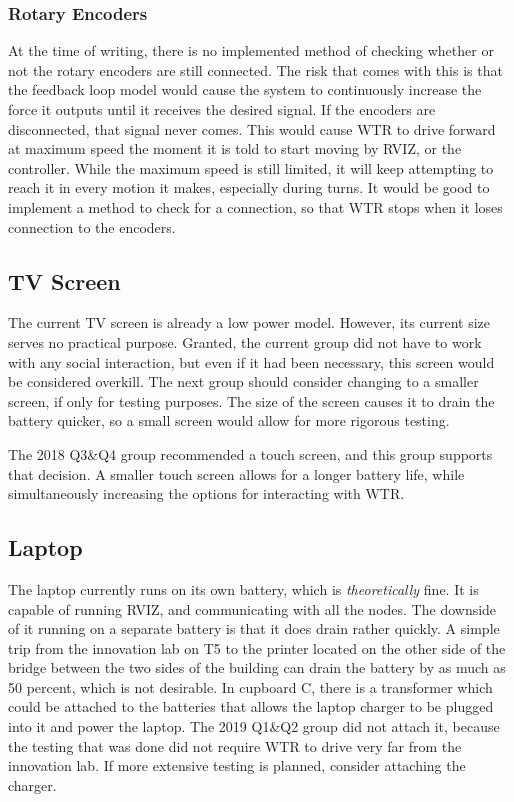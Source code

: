 \subsubsection{Rotary Encoders}
At the time of writing, there is no implemented method of checking whether or not the rotary encoders are still connected.
The risk that comes with this is that the feedback loop model would cause the system to continuously increase the force it outputs until it receives the desired signal.
If the encoders are disconnected, that signal never comes.
This would cause WTR to drive forward at maximum speed the moment it is told to start moving by RVIZ, or the controller.
While the maximum speed is still limited, it will keep attempting to reach it in every motion it makes, especially during turns.
It would be good to implement a method to check for a connection, so that WTR stops when it loses connection to the encoders.

\subsection{TV Screen}
The current TV screen is already a low power model.
However, its current size serves no practical purpose.
Granted, the current group did not have to work with any social interaction, but even if it had been necessary, this screen would be considered overkill.
The next group should consider changing to a smaller screen, if only for testing purposes.
The size of the screen causes it to drain the battery quicker, so a small screen would allow for more rigorous testing.

The 2018 Q3\&Q4 group recommended a touch screen, and this group supports that decision.
A smaller touch screen allows for a longer battery life, while simultaneously increasing the options for interacting with WTR.

\subsection{Laptop}
The laptop currently runs on its own battery, which is \textit{theoretically} fine.
It is capable of running RVIZ, and communicating with all the nodes.
The downside of it running on a separate battery is that it does drain rather quickly.
A simple trip from the innovation lab on T5 to the printer located on the other side of the bridge between the two sides of the building can drain the battery by as much as 50 percent, which is not desirable.
In cupboard C, there is a transformer which could be attached to the batteries that allows the laptop charger to be plugged into it and power the laptop.
The 2019 Q1\&Q2 group did not attach it, because the testing that was done did not require WTR to drive very far from the innovation lab.
If more extensive testing is planned, consider attaching the charger.

